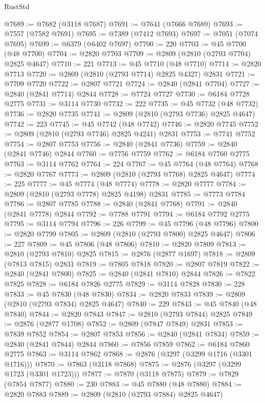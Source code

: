 \begin{lexlean}{RustStd}
\begin{coremodule}
@7689 := @7682 (@3118 @7687)
@7691 := @7641 (@7666 @7689)
@7693 := @7557 (@7582 @7691)
@7695 := @7389 (@7412 @7693)
@7697 := @7051 (@7074 @7695)
@7699 := @6379 (@6402 @7697)
@7700 := 220
@7703 := @45 @7700 (@48 @7700)
@7704 := @2820 @7703
@7709 := @2809 (@2810 (@2793 @7704) @2825 @4647)
@7710 := 221
@7713 := @45 @7710 (@48 @7710)
@7714 := @2820 @7713
@7720 := @2809 (@2810 (@2793 @7714) @2825 @4327) @2831
@7721 := @7709 @7720
@7722 := @2807 @7721
@7724 := @2840 (@2841 @7704)
@7727 := @2840 (@2841 @7714) @2844
@7728 := @7724 @7727
@7730 := @6184 @7728 @2775
@7731 := @3114 @7730
@7732 := 222
@7735 := @45 @7732 (@48 @7732)
@7736 := @2820 @7735
@7741 := @2809 (@2810 (@2793 @7736) @2825 @4647)
@7742 := 223
@7745 := @45 @7742 (@48 @7742)
@7746 := @2820 @7745
@7752 := @2809 (@2810 (@2793 @7746) @2825 @4241) @2831
@7753 := @7741 @7752
@7754 := @2807 @7753
@7756 := @2840 (@2841 @7736)
@7759 := @2840 (@2841 @7746) @2844
@7760 := @7756 @7759
@7762 := @6184 @7760 @2775
@7763 := @3114 @7762
@7764 := 224
@7767 := @45 @7764 (@48 @7764)
@7768 := @2820 @7767
@7773 := @2809 (@2810 (@2793 @7768) @2825 @4647)
@7774 := 225
@7777 := @45 @7774 (@48 @7774)
@7778 := @2820 @7777
@7784 := @2809 (@2810 (@2793 @7778) @2825 @4198) @2831
@7785 := @7773 @7784
@7786 := @2807 @7785
@7788 := @2840 (@2841 @7768)
@7791 := @2840 (@2841 @7778) @2844
@7792 := @7788 @7791
@7794 := @6184 @7792 @2775
@7795 := @3114 @7794
@7796 := 226
@7799 := @45 @7796 (@48 @7796)
@7800 := @2820 @7799
@7805 := @2809 (@2810 (@2793 @7800) @2825 @4647)
@7806 := 227
@7809 := @45 @7806 (@48 @7806)
@7810 := @2820 @7809
@7813 := @2810 (@2793 @7810) @2825
@7815 := @2876 (@2877 @1697)
@7818 := @2809 (@7813 @7815) @2831
@7819 := @7805 @7818
@7820 := @2807 @7819
@7822 := @2840 (@2841 @7800)
@7825 := @2840 (@2841 @7810) @2844
@7826 := @7822 @7825
@7828 := @6184 @7826 @2775
@7829 := @3114 @7828
@7830 := 228
@7833 := @45 @7830 (@48 @7830)
@7834 := @2820 @7833
@7839 := @2809 (@2810 (@2793 @7834) @2825 @4647)
@7840 := 229
@7843 := @45 @7840 (@48 @7840)
@7844 := @2820 @7843
@7847 := @2810 (@2793 @7844) @2825
@7849 := @2876 (@2877 @1708)
@7852 := @2809 (@7847 @7849) @2831
@7853 := @7839 @7852
@7854 := @2807 @7853
@7856 := @2840 (@2841 @7834)
@7859 := @2840 (@2841 @7844) @2844
@7860 := @7856 @7859
@7862 := @6184 @7860 @2775
@7863 := @3114 @7862
@7868 := @2876 (@3297 (@3299 @1716 (@3301 @1716)))
@7870 := @7863 (@3118 @7868)
@7875 := @2876 (@3297 (@3299 @1723 (@3301 @1723)))
@7877 := @7870 (@3118 @7875)
@7879 := @7829 (@7854 @7877)
@7880 := 230
@7883 := @45 @7880 (@48 @7880)
@7884 := @2820 @7883
@7889 := @2809 (@2810 (@2793 @7884) @2825 @4647)

\end{coremodule}
\end{lexlean}
